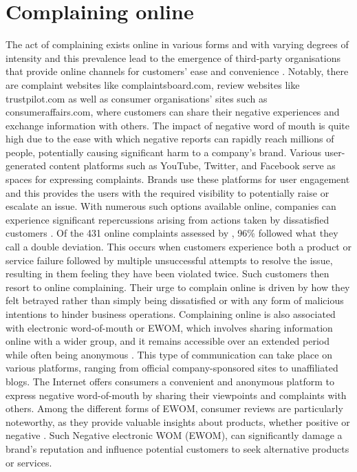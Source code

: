 \section{Complaining online}
The act of complaining exists online in various forms and with varying degrees of intensity and this prevalence lead to the emergence of third-party organisations that provide online channels for customers' ease and convenience \cite{tripp_when_2011}. Notably, there are complaint websites like complaintsboard.com, review websites like trustpilot.com as well as consumer organisations' sites such as consumeraffairs.com, where customers can share their negative experiences and exchange information with others. The impact of negative word of mouth is quite high due to the ease with which negative reports can rapidly reach millions of people, potentially causing significant harm to a company's brand. Various user-generated content platforms such as YouTube, Twitter, and Facebook serve as spaces for expressing complaints. Brands use these platforms for user engagement and this provides the users with the required visibility to potentially raise or escalate an issue. With numerous such options available online, companies can experience significant repercussions arising from actions taken by dissatisfied customers \cite{tripp_when_2011}.
\newline \newline
Of the 431 online complaints assessed by \cite{tripp_when_2011}, 96\% followed what they call a double deviation. This occurs when customers experience both a product or service failure followed by multiple unsuccessful attempts to resolve the issue, resulting in them feeling they have been violated twice. Such customers then resort to online complaining. Their urge to complain online is driven by how they felt betrayed rather than simply being dissatisfied or with any form of malicious intentions to hinder business operations.
\newline\newline
Complaining online is also associated with electronic word-of-mouth or EWOM, which involves sharing information online with a wider group, and it remains accessible over an extended period while often being anonymous \cite{hennig-thurauElectronicWordofmouthConsumeropinion2004}. This type of communication can take place on various platforms, ranging from official company-sponsored sites to unaffiliated blogs. The Internet offers consumers a convenient and anonymous platform to express negative word-of-mouth by sharing their viewpoints and complaints with others. Among the different forms of EWOM, consumer reviews are particularly noteworthy, as they provide valuable insights about products, whether positive or negative \cite{sparksComplainingCyberspaceMotives2010}. Such Negative electronic WOM (EWOM), can significantly damage a brand's reputation and influence potential customers to seek alternative products or services.
